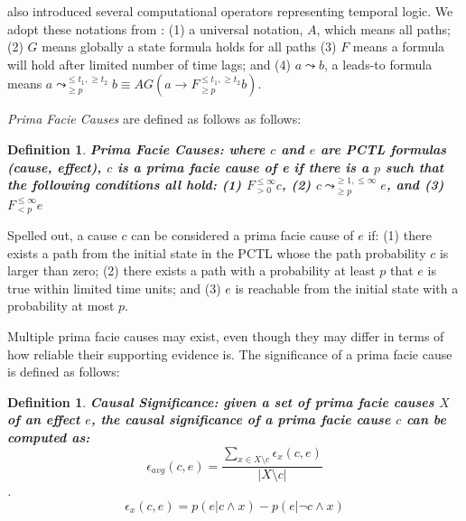 \documentclass[man,biblatex,floatsintext]{apa6}
\newtheorem{defn}[thm]{Definition}
\begin{document}
\textcite{hansson1994logic} also introduced several computational operators representing temporal logic. We adopt these notations from \textcite{kleinberg_uai09,kleinberg2012causality}: (1) a universal notation, $A$, which means all paths; (2) $G$ means globally a state formula holds for all paths (3) $F$ means a formula will hold after limited number of time lags; and (4) $a \leadsto b$, a leads-to formula means $a \leadsto _{\geq p}^{\leq t_{1}, \geq t_{2}} b \equiv AG (a \rightarrow F_{\geq p}^{\leq t_{1}, \geq t_{2}} b)$.

\emph{Prima Facie Causes} are defined as follows as follows:

\begin{defn} \textbf{Prima Facie Causes\parencite{kleinberg_uai09}: where $c$ and $e$ are PCTL formulas (cause, effect), $c$ is a prima facie cause of e if there is a $p$ such that the following conditions all hold: (1) $F_{> 0}^{\leq \infty }c$, (2) $c\leadsto_{\geq p}^{\geq 1,\leq \infty}e$, and (3) $F_{<p}^{\leq \infty }e$}
\end{defn}

Spelled out, a cause $c$ can be considered a prima facie cause of $e$ if: (1) there exists a path from the initial state in the PCTL whose the path probability $c$ is larger than zero; (2) there exists a path with a probability at least $p$ that $e$ is true within limited time units; and (3) $e$ is reachable from the initial state with a probability at most $p$.

Multiple prima facie causes may exist, even though they may differ in terms of how reliable their supporting evidence is. The significance of a prima facie cause is defined as follows:

\begin{defn}
\textbf{Causal Significance\parencite{kleinberg_uai09}: given a set of prima facie causes $X$ of an effect $e$, the causal significance of a prima facie cause $c$ can be computed as:}
\label{def:CausalSig}
\begin{equation}
\epsilon _{avg} (c,e) = \frac{\sum_{x\in X\setminus c} \epsilon _{x} (c,e) }{\left | X \setminus c \right |}
\end{equation}.
\begin{equation}
\epsilon _{x} (c,e) = p(e|c\wedge x)-p(e|\neg c\wedge x)
\end{equation}
\end{defn}
\end{document}

